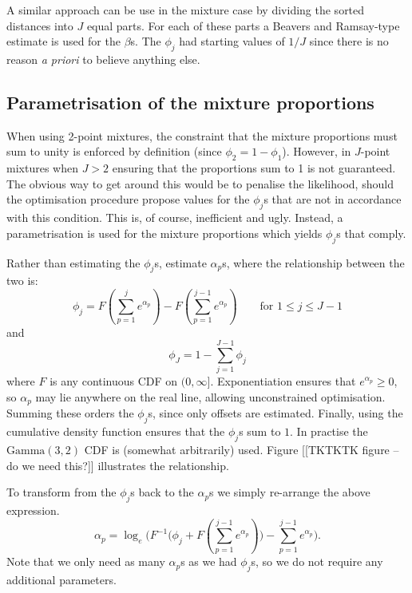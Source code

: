 \documentclass[useAMS,referee, usegraphicx]{biom}
\begin{document}
A similar approach can be use in the mixture case by dividing the sorted distances into $J$ equal parts. For each of these parts a Beavers and Ramsay-type estimate is used for the $\beta$s. The $\phi_j$ had starting values of $1/J$ since there is no reason \textit{a priori} to believe anything else.

\subsection{Parametrisation of the mixture proportions}

When using 2-point mixtures, the constraint that the mixture proportions must sum to unity is enforced by definition (since $\phi_2=1-\phi_1$). However, in $J$-point mixtures when $J>2$ ensuring that the proportions sum to 1 is not guaranteed. The obvious way to get around this would be to penalise the likelihood, should the optimisation procedure propose values for the $\phi_j$s that are not in accordance with this condition. This is, of course, inefficient and ugly. Instead, a parametrisation is used for the mixture proportions which yields $\phi_j$s that comply.

Rather than estimating the $\phi_j$s, estimate $\alpha_p$s, where the relationship between the two is:
\begin{equation*}
\phi_j = F(\sum_{p=1}^j e^{\alpha_p}) - F(\sum_{p=1}^{j-1} e^{\alpha_p}) \qquad \text{for } 1\leq j \leq J-1
\end{equation*}
and
\begin{equation*}
\phi_J = 1-\sum_{j=1}^{J-1} \phi_j
\end{equation*}
where $F$ is any continuous CDF on $(0,\infty]$. Exponentiation ensures that $e^{\alpha_p}\geq0$, so $\alpha_p$ may lie anywhere on the real line, allowing unconstrained optimisation. Summing these orders the $\phi_j$s, since only offsets are estimated. Finally, using the cumulative density function ensures that the $\phi_j$s sum to $1$. In practise the $\text{Gamma}(3,2)$ CDF is (somewhat arbitrarily) used. Figure [[TKTKTK figure -- do we need this?]] illustrates the relationship.

To transform from the $\phi_j$s back to the $\alpha_p$s we simply re-arrange the above expression.
\begin{equation*}
\alpha_p = \log_e \Big(F^{-1}\Big(\phi_j + F(\sum_{p=1}^{j-1} e^{\alpha_p})\Big) - \sum_{p=1}^{j-1} e^{\alpha_p}\Big).
\end{equation*}
Note that we only need as many $\alpha_p$s as we had $\phi_j$s, so we do not require any additional parameters.
\end{document}
